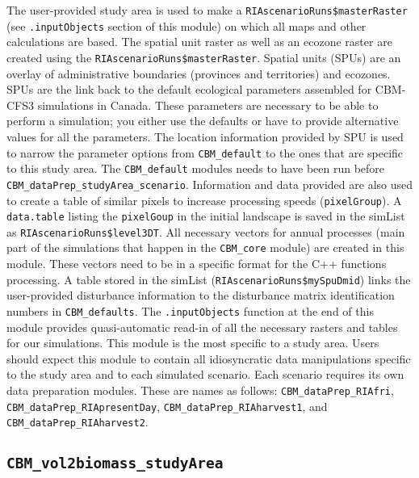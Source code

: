 \documentclass[
]{article}
\begin{document}
The user-provided study area is used to make a
\texttt{RIAscenarioRuns\$masterRaster} (see \texttt{.inputObjects}
section of this module) on which all maps and other calculations are
based. The spatial unit raster as well as an ecozone raster are created
using the \texttt{RIAscenarioRuns\$masterRaster}. Spatial units (SPUs)
are an overlay of administrative boundaries (provinces and territories)
and ecozones. SPUs are the link back to the default ecological
parameters assembled for CBM-CFS3 simulations in Canada. These
parameters are necessary to be able to perform a simulation; you either
use the defaults or have to provide alternative values for all the
parameters. The location information provided by SPU is used to narrow
the parameter options from \texttt{CBM\_default} to the ones that are
specific to this study area. The \texttt{CBM\_default} modules needs to
have been run before \texttt{CBM\_dataPrep\_studyArea\_scenario}.
Information and data provided are also used to create a table of similar
pixels to increase processing speeds (\texttt{pixelGroup}). A
\texttt{data.table} listing the \texttt{pixelGoup} in the initial
landscape is saved in the simList as \texttt{RIAscenarioRuns\$level3DT}.
All necessary vectors for annual processes (main part of the simulations
that happen in the \texttt{CBM\_core} module) are created in this
module. These vectors need to be in a specific format for the C++
functions processing. A table stored in the simList
(\texttt{RIAscenarioRuns\$mySpuDmid}) links the user-provided
disturbance information to the disturbance matrix identification numbers
in \texttt{CBM\_defaults}. The \texttt{.inputObjects} function at the
end of this module provides quasi-automatic read-in of all the necessary
rasters and tables for our simulations. This module is the most specific
to a study area. Users should expect this module to contain all
idiosyncratic data manipulations specific to the study area and to each
simulated scenario. Each scenario requires its own data preparation
modules. These are names as follows: \texttt{CBM\_dataPrep\_RIAfri},
\texttt{CBM\_dataPrep\_RIApresentDay},
\texttt{CBM\_dataPrep\_RIAharvest1}, and
\texttt{CBM\_dataPrep\_RIAharvest2}.

\hypertarget{cbm_vol2biomass_studyarea}{%
\subsection{\texorpdfstring{\texttt{CBM\_vol2biomass\_studyArea}}{CBM\_vol2biomass\_studyArea}}\label{cbm_vol2biomass_studyarea}}
\end{document}
